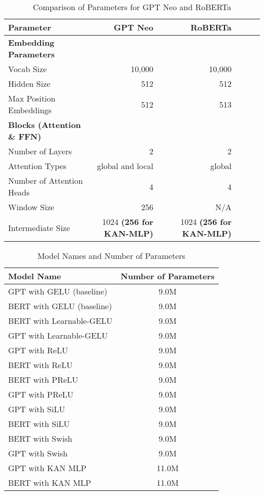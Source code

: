 \begin{table*}[h!]
    \centering
    \begin{tabular}{lrrrrr}
    \hline
    \toprule \textbf{Parameter} & \textbf{GPT Neo} & \textbf{RoBERTa} \\ \hline
    \toprule \textbf{Embedding Parameters} & & \\ \hline
    Vocab Size & 10,000 & 10,000 \\ \hline
    Hidden Size & 512 & 512 \\ \hline
    Max Position Embeddings & 512 & 513 \\ \hline
    \toprule \textbf{Blocks (Attention \& FFN)} & & \\ \hline
    Number of Layers & 2 & 2 \\ \hline
    Attention Types & global and local & global \\ \hline
    Number of Attention Heads & 4 & 4 \\ \hline
    Window Size & 256 & N/A \\ \hline
    Intermediate Size & 1024 \textbf{(256 for KAN-MLP)} & 1024 \textbf{(256 for KAN-MLP)} \\ \hline
    \end{tabular}
    \caption{Comparison of Parameters for GPT Neo and RoBERTa}
    \label{tab:Hyperparameters}
\end{table*}

\begin{table}[h!]
    \centering
    \begin{tabular}{|l|c|}
    \hline
    \textbf{Model Name} & \textbf{Number of Parameters} \\ \hline
    GPT with GELU (baseline) & 9.0M \\ \hline
    BERT with GELU (baseline) & 9.0M \\ \hline
    BERT with Learnable-GELU & 9.0M \\ \hline
    GPT with Learnable-GELU & 9.0M \\ \hline
    GPT with ReLU & 9.0M \\ \hline
    BERT with ReLU & 9.0M \\ \hline
    BERT with PReLU & 9.0M \\ \hline
    GPT with PReLU & 9.0M \\ \hline
    GPT with SiLU & 9.0M \\ \hline
    BERT with SiLU & 9.0M \\ \hline
    BERT with Swish & 9.0M \\ \hline
    GPT with Swish & 9.0M \\ \hline
    GPT with KAN MLP & 11.0M \\ \hline
    BERT with KAN MLP & 11.0M \\ \hline
    \end{tabular}
    \caption{Model Names and Number of Parameters}
    \label{tab:parameter-counts}
\end{table}